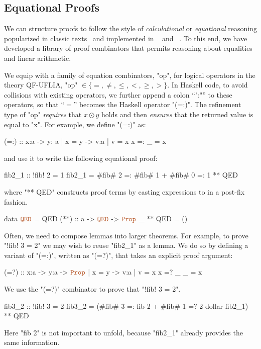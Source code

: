 
\subsection{Equational Proofs}\label{subsection:overview:equational}

We can {structure} proofs to follow the
style of \emph{calculational} or \emph{equational}
reasoning popularized in classic texts~\cite{Dijkstra76,Bird89}
and implemented in \agda~\citep{agdaequational}
and \dafny~\citep{LeinoPolikarpova16}.
%
To this end, we have developed a library
of proof combinators that permits reasoning
about equalities and linear arithmetic.



%
We equip \toolname with a family of
equation combinators, "op", for
logical operators in the theory QF-UFLIA,
"op" $\in \{ =, \not =, \leq, <, \geq, > \}$.
%
In Haskell code, to avoid collisions with existing operators,
we further append a colon ``":"'' to these operators, so that ``$=$''
becomes the Haskell operator "(=:)".
%
The refinement type of "op"  \emph{requires}
that $x \odot y$ holds and then \emph{ensures}
that the returned value is equal to "x".
%
For example, we define "(=:)" as:
%
\begin{mcode}
    (=:) :: x:a -> y:{ a | x = y } -> { v:a | v = x }
    x =: _ = x
\end{mcode}
%
and use it to write the following equational proof:
%
\begin{mcode}
    fib2_1 :: { !fib! 2 = 1 }
    fib2_1 =  #fib# 2 =: #fib# 1 + #fib# 0 =: 1 ** QED
\end{mcode} %
%
where "** QED" constructs proof terms by
casting expressions to \typp in a post-fix
fashion.
\begin{mcode}
    data $\tqed$ = QED            (**) :: a -> $\tqed$ -> $\typp$
                              _ ** QED = ()
\end{mcode}

Often, we need to compose lemmas into larger
theorems. For example, to prove "!fib! 3 = 2" we
may wish to reuse "fib2_1" as a lemma.
%
We do so by defining a variant of "(=:)", written as "(=?)",
that takes an explicit proof argument: 
\begin{mcode}
    (=?) :: x:a -> y:a -> { $\typp$ | x = y } -> { v:a | v = x }
    x =? _ _ = x
\end{mcode}
%
We use the "(=?)" combinator to prove that "!fib! 3 = 2".
%
\begin{mcode}
    fib3_2 :: { !fib! 3 = 2 }
    fib3_2 = (#fib# 3 =: fib 2 + #fib# 1 =? 2 dollar fib2_1) ** QED
\end{mcode}
%
Here "fib 2" is not important to unfold, because "fib2_1"
already provides the same information.

